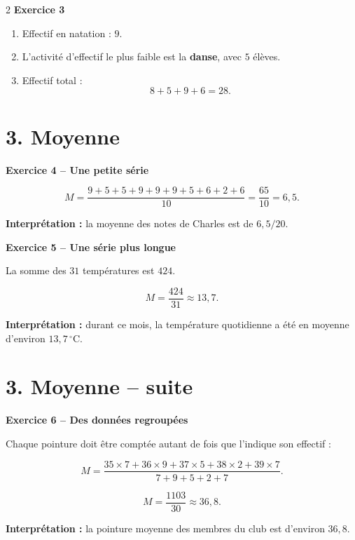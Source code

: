 \documentclass[11pt,a4paper,landscape]{article}
\newcommand{\soustitreexo}[1]{%
  {\sffamily\bfseries\color{TitreC}#1}\par
  \vspace{0.04em}
}
\begin{document}
\begin{multicols*}{2}
\soustitreexo{Exercice 3}

\begin{enumerate}[label=\alph*)]
  \item Effectif en natation : \(\boxed{9}\).
  \item L'activité d'effectif le plus faible est la \textbf{danse}, avec \(\boxed{5}\) élèves.
  \item Effectif total :
  \[
  8+5+9+6=\boxed{28}.
  \]
\end{enumerate}

\section*{3. Moyenne}

\soustitreexo{Exercice 4 -- Une petite série}

\[
M=\frac{9+5+5+9+9+9+5+6+2+6}{10}
=\frac{65}{10}
=\boxed{6{,}5}.
\]

\textbf{Interprétation :} la moyenne des notes de Charles est de
\(\boxed{6{,}5/20}\).

\soustitreexo{Exercice 5 -- Une série plus longue}

La somme des \(31\) températures est \(424\).

\[
M=\frac{424}{31}\approx\boxed{13{,}7}.
\]

\textbf{Interprétation :} durant ce mois, la température quotidienne
a été en moyenne d'environ \(\boxed{13{,}7\,^\circ\mathrm{C}}\).

\columnbreak

\section*{3. Moyenne -- suite}

\soustitreexo{Exercice 6 -- Des données regroupées}

Chaque pointure doit être comptée autant de fois que l'indique son effectif :

\[
M=
\frac{
35\times7+
36\times9+
37\times5+
38\times2+
39\times7
}{
7+9+5+2+7
}.
\]

\[
M=\frac{1103}{30}\approx\boxed{36{,}8}.
\]

\textbf{Interprétation :} la pointure moyenne des membres du club
est d'environ \(\boxed{36{,}8}\).



\end{multicols*}
\end{document}
